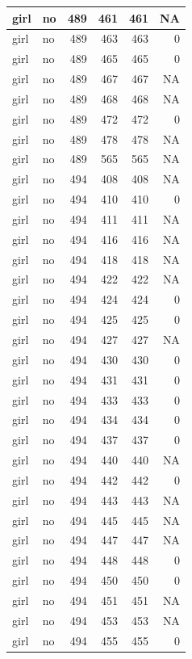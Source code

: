 \documentclass[man]{apa6}
\begin{document}
\begin{tabular}{l|l|r|r|r|r}
\hline
girl & no & 489 & 461 & 461 & NA\\
\hline
girl & no & 489 & 463 & 463 & 0\\
\hline
girl & no & 489 & 465 & 465 & 0\\
\hline
girl & no & 489 & 467 & 467 & NA\\
\hline
girl & no & 489 & 468 & 468 & NA\\
\hline
girl & no & 489 & 472 & 472 & 0\\
\hline
girl & no & 489 & 478 & 478 & NA\\
\hline
girl & no & 489 & 565 & 565 & NA\\
\hline
girl & no & 494 & 408 & 408 & NA\\
\hline
girl & no & 494 & 410 & 410 & 0\\
\hline
girl & no & 494 & 411 & 411 & NA\\
\hline
girl & no & 494 & 416 & 416 & NA\\
\hline
girl & no & 494 & 418 & 418 & NA\\
\hline
girl & no & 494 & 422 & 422 & NA\\
\hline
girl & no & 494 & 424 & 424 & 0\\
\hline
girl & no & 494 & 425 & 425 & 0\\
\hline
girl & no & 494 & 427 & 427 & NA\\
\hline
girl & no & 494 & 430 & 430 & 0\\
\hline
girl & no & 494 & 431 & 431 & 0\\
\hline
girl & no & 494 & 433 & 433 & 0\\
\hline
girl & no & 494 & 434 & 434 & 0\\
\hline
girl & no & 494 & 437 & 437 & 0\\
\hline
girl & no & 494 & 440 & 440 & NA\\
\hline
girl & no & 494 & 442 & 442 & 0\\
\hline
girl & no & 494 & 443 & 443 & NA\\
\hline
girl & no & 494 & 445 & 445 & NA\\
\hline
girl & no & 494 & 447 & 447 & NA\\
\hline
girl & no & 494 & 448 & 448 & 0\\
\hline
girl & no & 494 & 450 & 450 & 0\\
\hline
girl & no & 494 & 451 & 451 & NA\\
\hline
girl & no & 494 & 453 & 453 & NA\\
\hline
girl & no & 494 & 455 & 455 & 0\\

\end{tabular}
\end{document}
